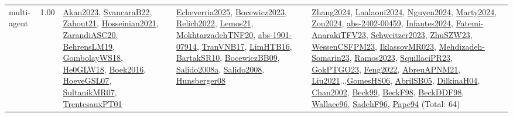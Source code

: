 {\begin{longtable}{p{3cm}r>{\raggedright\arraybackslash}p{6cm}>{\raggedright\arraybackslash}p{6cm}>{\raggedright\arraybackslash}p{8cm}}
\index{multi-agent}\index{Concepts!multi-agent}multi-agent &  1.00 & \hyperref[detail:Akan2023]{Akan2023}, \hyperref[detail:SvancaraB22]{SvancaraB22}, \hyperref[detail:Zahout21]{Zahout21}, \hyperref[detail:Hosseinian2021]{Hosseinian2021}, \hyperref[detail:ZarandiASC20]{ZarandiASC20}, \hyperref[detail:BehrensLM19]{BehrensLM19}, \hyperref[detail:GombolayWS18]{GombolayWS18}, \hyperref[detail:He0GLW18]{He0GLW18}, \hyperref[detail:Boek2016]{Boek2016}, \hyperref[detail:HoeveGSL07]{HoeveGSL07}, \hyperref[detail:SultanikMR07]{SultanikMR07}, \hyperref[detail:TrentesauxPT01]{TrentesauxPT01} & \hyperref[detail:Echeverria2025]{Echeverria2025}, \hyperref[detail:Bocewicz2023]{Bocewicz2023}, \hyperref[detail:Relich2022]{Relich2022}, \hyperref[detail:Lemos21]{Lemos21}, \hyperref[detail:MokhtarzadehTNF20]{MokhtarzadehTNF20}, \hyperref[detail:abs-1901-07914]{abs-1901-07914}, \hyperref[detail:TranVNB17]{TranVNB17}, \hyperref[detail:LimHTB16]{LimHTB16}, \hyperref[detail:BartakSR10]{BartakSR10}, \hyperref[detail:BocewiczBB09]{BocewiczBB09}, \hyperref[detail:Salido2008a]{Salido2008a}, \hyperref[detail:Salido2008]{Salido2008}, \hyperref[detail:Hunsberger08]{Hunsberger08} & \hyperref[detail:Zhang2024]{Zhang2024}, \hyperref[detail:Laalaoui2024]{Laalaoui2024}, \hyperref[detail:Nguyen2024]{Nguyen2024}, \hyperref[detail:Marty2024]{Marty2024}, \hyperref[detail:Zou2024]{Zou2024}, \hyperref[detail:abs-2402-00459]{abs-2402-00459}, \hyperref[detail:Infantes2024]{Infantes2024}, \hyperref[detail:Fatemi-AnarakiTFV23]{Fatemi-AnarakiTFV23}, \hyperref[detail:Schweitzer2023]{Schweitzer2023}, \hyperref[detail:ZhuSZW23]{ZhuSZW23}, \hyperref[detail:WessenCSFPM23]{WessenCSFPM23}, \hyperref[detail:IklassovMR023]{IklassovMR023}, \hyperref[detail:Mehdizadeh-Somarin23]{Mehdizadeh-Somarin23}, \hyperref[detail:Ramos2023]{Ramos2023}, \hyperref[detail:SquillaciPR23]{SquillaciPR23}, \hyperref[detail:GokPTGO23]{GokPTGO23}, \hyperref[detail:Feng2022]{Feng2022}, \hyperref[detail:AbreuAPNM21]{AbreuAPNM21}, \hyperref[detail:Liu2021]{Liu2021}...\hyperref[detail:GomesHS06]{GomesHS06}, \hyperref[detail:AbrilSB05]{AbrilSB05}, \hyperref[detail:DilkinaH04]{DilkinaH04}, \hyperref[detail:Chan2002]{Chan2002}, \hyperref[detail:Beck99]{Beck99}, \hyperref[detail:BeckF98]{BeckF98}, \hyperref[detail:BeckDDF98]{BeckDDF98}, \hyperref[detail:Wallace96]{Wallace96}, \hyperref[detail:SadehF96]{SadehF96}, \hyperref[detail:Pape94]{Pape94} (Total: 64)\\

\end{longtable}}
